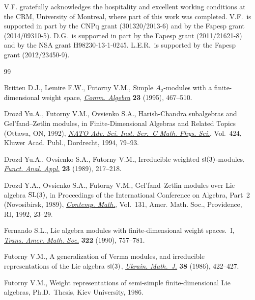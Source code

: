 \documentclass[pdftex]{sigma}
\numberwithin{equation}{section}
\begin{document}
V.F. gratefully acknowledges the hospitality and excellent working conditions
at the CRM, University of Montreal, where part of this work was completed.
V.F.~is supported in part by the CNPq grant (301320/2013-6) and by the Fapesp grant (2014/09310-5).
D.G.~is supported in part by the Fapesp grant (2011/21621-8) and by the NSA grant H98230-13-1-0245.
L.E.R.~is supported by the Fapesp grant (2012/23450-9).


\begin{thebibliography}{99}
\footnotesize \itemsep=0pt

Britten D.J., Lemire F.W., Futorny V.M., Simple {$A_2$}-modules with a
  f\/inite-dimensional weight space, \href{http://dx.doi.org/10.1080/00927879508825232}{\textit{Comm. Algebra}} \textbf{23} (1995),
  467--510.

Drozd Yu.A., Futorny V.M., Ovsienko S.A., Harish-{C}handra subalgebras and
  {G}el'fand--{Z}etlin mo\-du\-les, in Finite-Dimensional Algebras and Related
  Topics ({O}ttawa, {ON}, 1992), \href{http://dx.doi.org/10.1007/978-94-017-1556-0_5}{\textit{NATO Adv. Sci. Inst. Ser.~C Math.
  Phys. Sci.}}, Vol.~424, Kluwer Acad. Publ., Dordrecht, 1994, 79--93.

Drozd Yu.A., Ovsienko S.A., Futorny V.M., Irreducible weighted {${\rm
  sl}(3)$}-modules, \href{http://dx.doi.org/10.1007/BF01079528}{\textit{Funct. Anal. Appl.}} \textbf{23} (1989), 217--218.

Drozd Y.A., Ovsienko S.A., Futorny V.M., Gel'fand--{Z}etlin modules over {L}ie
  algebra {${\rm SL}(3)$}, in Proceedings of the {I}nternational {C}onference
  on {A}lgebra, {P}art~2 ({N}ovosibirsk, 1989), \href{http://dx.doi.org/10.1090/conm/131.2/1175818}{\textit{Contemp. Math.}}, Vol.~131, Amer. Math. Soc., Providence, RI, 1992, 23--29.

Fernando S.L., Lie algebra modules with f\/inite-dimensional weight spaces.~{I},
  \href{http://dx.doi.org/10.2307/2001724}{\textit{Trans. Amer. Math. Soc.}} \textbf{322} (1990), 757--781.

Futorny V.M., A generalization of {V}erma modules, and irreducible
  representations of the {L}ie algebra {${\rm sl}(3)$}, \href{http://dx.doi.org/10.1007/BF01057302}{\textit{Ukrain.
  Math.~J.}} \textbf{38} (1986), 422--427.

Futorny V.M., Weight representations of semi-simple f\/inite-dimensional Lie
  algebras, Ph.D.~Thesis, Kiev University, 1986.


\end{thebibliography}
\end{document}
